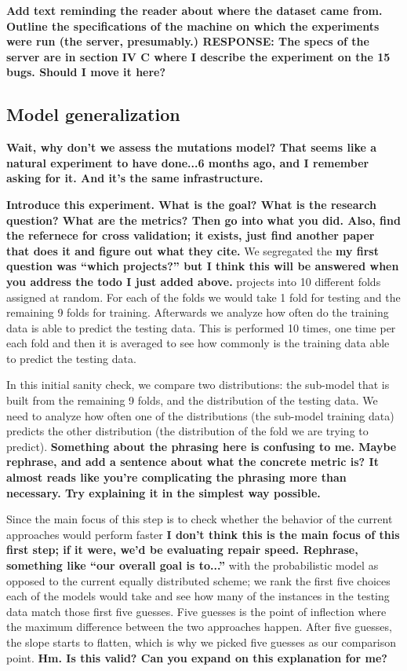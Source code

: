 \documentclass[conference]{IEEEtran}
\newcommand{\todo}[1]
  {{\scriptsize \textbf{\color{red} {#1}}}}
\begin{document}
\todo{Add text reminding the reader about where the dataset came from.  Outline
  the specifications of the machine on which the experiments were run (the
  server, presumably.) RESPONSE: The specs of the server are in section IV C where I describe the experiment on the 15 bugs. Should I move it here?}

\subsection{Model generalization}
\label{sec:generalize}

\todo{Wait, why don't we assess the mutations model?  That seems like a natural
  experiment to have done...6 months ago, and I remember asking for it.  And
  it's the same infrastructure.}

\todo{Introduce this experiment.  What is the goal?  What is the research
  question?  What are the metrics?  Then go into what you did.  Also, find the
  refernece for cross validation; it exists, just find another paper that does
  it and figure out what they cite.}
We segregated the\todo{my first question was ``which projects?'' but I think this will be answered when you address the todo I just added above.} projects into 10 
different folds assigned at random. For each of the 
folds we would take 1 fold for testing and the remaining 9 folds for training. 
Afterwards we analyze how often do the training data is able to predict the 
testing data. This is performed 10 times, one time per each fold and then it is 
averaged to see how commonly is the training data able to predict the testing 
data.

In this initial sanity check, we compare two distributions: the sub-model 
that is built from the remaining 9 folds, and the distribution of the testing 
data. We need to analyze how often one of the distributions (the sub-model 
training data) predicts the other distribution (the distribution of the fold we 
are trying to predict). \todo{Something about the phrasing here is confusing to
  me.  Maybe rephrase, and add a sentence about what the concrete metric is?  It
  almost reads like you're complicating the phrasing more than necessary.  Try
  explaining it in the simplest way possible.}

Since the main focus of this step is to check whether the behavior of the 
current approaches would perform faster\todo{I don't think this is the main
  focus of this first step; if it were, we'd be evaluating repair speed.
  Rephrase, something like ``our overall goal is to...''} with the probabilistic model as opposed 
to the current equally distributed scheme; we rank the first five choices each 
of the models would take and see how many of the instances in the testing data 
match those first five guesses. Five guesses is the point of inflection where
the maximum difference between the two approaches happen. After five guesses,
the slope starts to flatten, which is why we picked five guesses as our
comparison point.\todo{Hm.  Is this valid?  Can you expand on this explanation for me?}
\end{document}

